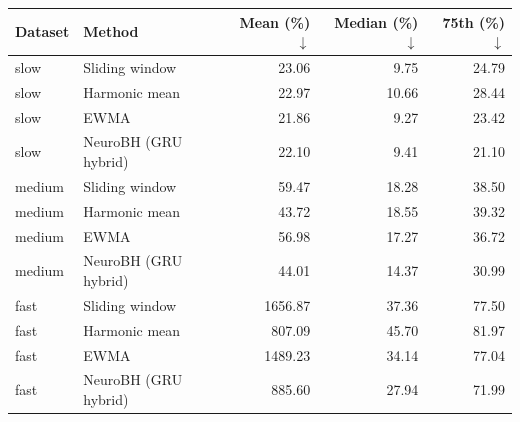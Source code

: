 \begin{tabular}{llrrr}
\toprule
Dataset & Method & Mean (\%) $\downarrow$ & Median (\%) $\downarrow$ & 75th (\%) $\downarrow$ \\
\midrule
slow & Sliding window & 23.06 & 9.75 & 24.79 \\
slow & Harmonic mean & 22.97 & 10.66 & 28.44 \\
slow & EWMA & 21.86 & 9.27 & 23.42 \\
slow & NeuroBH (GRU hybrid) & 22.10 & 9.41 & 21.10 \\
medium & Sliding window & 59.47 & 18.28 & 38.50 \\
medium & Harmonic mean & 43.72 & 18.55 & 39.32 \\
medium & EWMA & 56.98 & 17.27 & 36.72 \\
medium & NeuroBH (GRU hybrid) & 44.01 & 14.37 & 30.99 \\
fast & Sliding window & 1656.87 & 37.36 & 77.50 \\
fast & Harmonic mean & 807.09 & 45.70 & 81.97 \\
fast & EWMA & 1489.23 & 34.14 & 77.04 \\
fast & NeuroBH (GRU hybrid) & 885.60 & 27.94 & 71.99 \\
\bottomrule
\end{tabular}